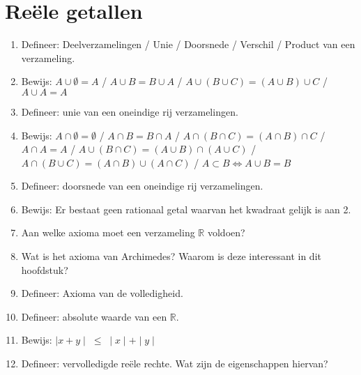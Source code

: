 \documentclass[12pt]{article}
\newcommand{\R}{\mathbb{R}}
\begin{document}
    \maketitle

    \section{Reële getallen}
    \begin{enumerate}
        \item Defineer: Deelverzamelingen / Unie / Doorsnede / Verschil / Product van een verzameling.
        \item Bewijs: $A \cup \emptyset = A$ / $A \cup B = B \cup A$ / $A \cup (B \cup C) = (A \cup B) \cup C$ / $A \cup A = A$
        \item Defineer: unie van een oneindige rij verzamelingen.
        \item Bewijs: $A \cap \emptyset = \emptyset$ / $A \cap B = B \cap A$ / $A \cap (B \cap C) = (A \cap B)\cap C$ / $A \cap A = A$ / $A \cup (B \cap C) = (A \cup B) \cap (A \cup C)$ / $A \cap (B \cup C) = (A \cap B) \cup (A \cap C)$ / $A \subset B \Leftrightarrow A \cup B = B$
        \item Defineer: doorsnede van een oneindige rij verzamelingen.
        \item Bewijs: Er bestaat geen rationaal getal waarvan het kwadraat gelijk is aan 2.
        \item Aan welke axioma moet een verzameling $\R$ voldoen?
        \item Wat is het axioma van Archimedes? Waarom is deze interessant in dit hoofdstuk?
        \item Defineer: Axioma van de volledigheid.
        \item Defineer: absolute waarde van een $\R$.
        \item Bewijs: $\mid x+y \mid \; \leq \; \mid x \mid + \mid y \mid$ 
        \item Defineer: vervolledigde reële rechte. Wat zijn de eigenschappen hiervan?
    \end{enumerate}
\end{document}
